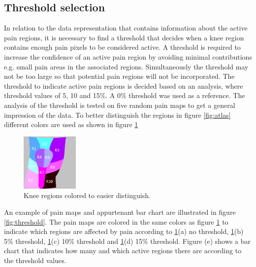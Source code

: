 \subsection{Threshold selection}\label{sec:Selectthreshold}
In relation to the data representation that contains information about the active pain regions, it is necessary to find a threshold that decides when a knee region contains enough pain pixels to be considered active. A threshold is required to increase the confidence of an active pain region by avoiding minimal contributions e.g. small pain areas in the associated regions. Simultaneously the threshold may not be too large so that potential pain regions will not be incorporated. The threshold to indicate active pain regions is decided based on an analysis, where threshold values of 5, 10 and 15\%. A 0\% threshold was used as a reference. 
The analysis of the threshold is tested on five random pain maps to get a general impression of the data. To better distinguish the regions in figure \ref{fig:atlas} different colors are used as shown in figure \ref{fig:colorregion}


\begin{figure} [H]
\centering
\includegraphics[width=0.25\textwidth]{figures/colorregion}
\caption{Knee regions colored to easier distinguish.}
\label{fig:colorregion}
\end{figure}

\noindent
An example of pain maps and appurtenant bar chart are illustrated in figure \ref{fig:threshold}. The pain maps are colored in the same colors as figure \ref{fig:colorregion} to indicate which regions are affected by pain according to \ref{fig:colorregion}(a) no threshold, \ref{fig:colorregion}(b) 5\% threshold, \ref{fig:colorregion}(c) 10\% threshold and \ref{fig:colorregion}(d) 15\% threshold. 
Figure (e) shows a bar chart that indicates how many and which active regions there are according to the threshold values.

